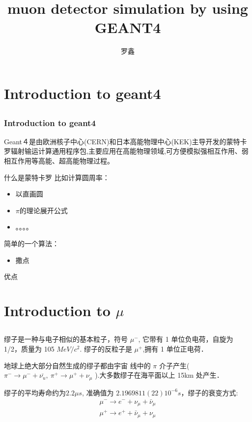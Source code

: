 \documentclass[notheorems, aspectratio=54]{beamer}
\title[muon detector simulation by using GEANT4]{muon detector simulation by using GEANT4}
\author{罗鑫}
\institute[SYSU]{luox46@mail2.sysu.edu.cn}
\begin{document}
\begin{frame}
    \titlepage
\end{frame}

\section{Introduction to geant4}
\subsection{}
\begin{frame}
  \frametitle{Introduction to geant4}
  Geant４是由欧洲核子中心(CERN)和日本高能物理中心(KEK)主导开发的蒙特卡罗辐射输运计算通用程序包,主要应用在高能物理领域,可方便模拟强相互作用、弱相互作用等高能、超高能物理过程。
\begin{block}{什么是蒙特卡罗}
  比如计算圆周率：
  \begin{itemize}
    \item 以直画圆
    \item $\pi$的理论展开公式
    \item 。。。。
  \end{itemize}
  简单的一个算法：
  \begin{itemize}
    \item 撒点
  \end{itemize}
\end{block}

\begin{block}{}
优点
\end{block}
\end{frame}
\section{Introduction to $\mu$}
\subsection{}

\begin{frame}
缪子是一种与电子相似的基本粒子，符号 $\mu^-$, 它带有 1 单位负电荷，自旋为 1/2，质量为 105 $MeV/c^2$. 缪子的反粒子是 $\mu^+$,拥有 1 单位正电荷．

地球上绝大部分自然生成的缪子都由宇宙
线中的 $\pi$ 介子产生($\pi^- \rightarrow \mu^- + \bar{\nu_u},\ \pi^+\rightarrow \mu^+ + \nu_\mu$ ).大多数缪子在海平面以上 15km 处产生．

缪子的平均寿命约为$2.2\mu s$, 准确值为 $2.1969811(22) 10^{−6} s$，缪子的衰变方式:
\begin{align}
\mu^- \rightarrow e^- + \nu_\mu + \bar\nu_\mu \\
\mu^+ \rightarrow e^+ + \bar\nu_\mu + \nu_\mu
\end{align}


\end{frame}
\end{document}
